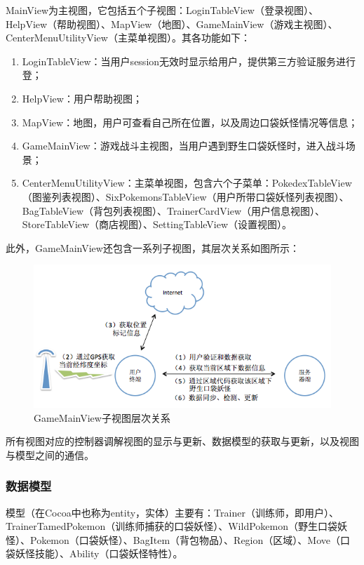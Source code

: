 \documentclass{article}
\begin{document}
\begin{CJK}{UTF8}{gbsn}
  MainView为主视图，它包括五个子视图：LoginTableView（登录视图）、HelpView（帮助视图）、MapView（地图）、GameMainView（游戏主视图）、CenterMenuUtilityView（主菜单视图）。其各功能如下：

  \begin{enumerate}
		\item LoginTableView：当用户session无效时显示给用户，提供第三方验证服务进行登；
		\item HelpView：用户帮助视图；
		\item MapView：地图，用户可查看自己所在位置，以及周边口袋妖怪情况等信息；
		\item GameMainView：游戏战斗主视图，当用户遇到野生口袋妖怪时，进入战斗场景；
		\item CenterMenuUtilityView：主菜单视图，包含六个子菜单：PokedexTableView（图鉴列表视图）、SixPokemonsTableView（用户所带口袋妖怪列表视图）、BagTableView（背包列表视图）、TrainerCardView（用户信息视图）、StoreTableView（商店视图）、SettingTableView（设置视图）。
  \end{enumerate}

  此外，GameMainView还包含一系列子视图，其层次关系如图所示：

  \begin{figure}[htbp]
		\centering
		\includegraphics[bb=0 0 548 341, scale=0.45]{figure/fig_n04.png}
		\caption{GameMainView子视图层次关系}
		\label{fig:n04}
	\end{figure}

  所有视图对应的控制器调解视图的显示与更新、数据模型的获取与更新，以及视图与模型之间的通信。

	\subsubsection{数据模型}
  模型（在Cocoa中也称为entity，实体）主要有：Trainer（训练师，即用户）、TrainerTamedPokemon（训练师捕获的口袋妖怪）、WildPokemon（野生口袋妖怪）、Pokemon（口袋妖怪）、BagItem（背包物品）、Region（区域）、Move（口袋妖怪技能）、Ability（口袋妖怪特性）。


\end{CJK}
\end{document}
